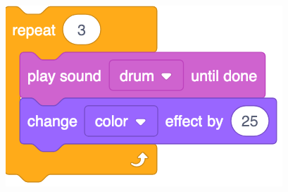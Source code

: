 \documentclass[letterpaper,12pt]{article}
\begin{document}
\noindent \dotfill \\

\begin{center}
\includegraphics[scale=.3]{q4_script0.png}
\end{center}
\end{document}
